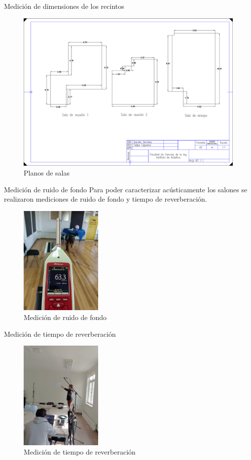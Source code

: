 \documentclass{sintefbeamer}
\begin{document}
\begin{frame}{Medición de dimensiones de los recintos}
\begin{figure}
    \centering
    \includegraphics[scale=0.2]{images/Planos/Planos.png}
    \caption{Planos de salas}
    \label{fig: planos}
\end{figure}
\end{frame}
\begin{frame}{Medición de ruido de fondo}
    Para poder caracterizar acústicamente los salones se realizaron mediciones de ruido de fondo y tiempo de reverberación.
    \begin{figure}[H]
        \centering
        \includegraphics[width=4cm]{images/Fotos Mediciones/medicionRDF.jpeg}
        \caption{Medición de ruido de fondo}
        \label{fig: medicion de rdf}
    \end{figure}
\end{frame}
\begin{frame}{Medición de tiempo de reverberación}
    \begin{figure}[H]
        \includegraphics[width=4cm]{images/Fotos Mediciones/medicionRT.jpeg}
        \caption{Medición de tiempo de reverberación}
        \label{fig: medicion rt}
    \end{figure}
\end{frame}
\end{document}
